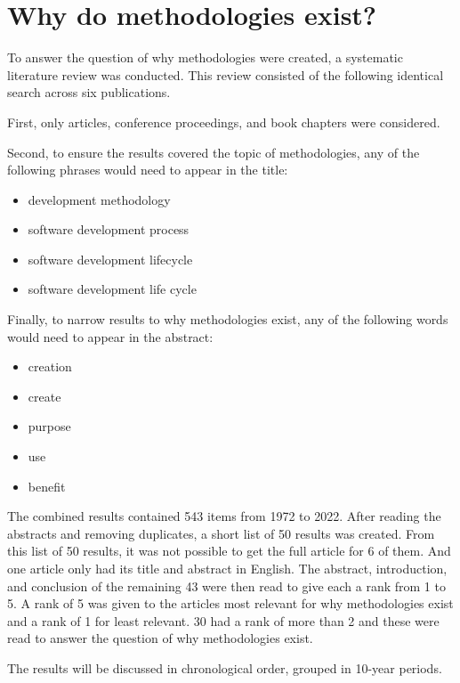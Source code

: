 \section{Why do methodologies exist?}
\label{sec:meth_why}
To answer the question of why methodologies were created, a systematic literature review  was conducted.
This review consisted of the following identical search across six publications.


First, only articles, conference proceedings, and book chapters were considered.

Second, to ensure the results covered the topic of methodologies, any of the following phrases would need to appear in the title:
\begin{itemize}
    \item development methodology
    \item software development process
    \item software development lifecycle
    \item software development life cycle
\end{itemize}

Finally, to narrow results to why methodologies exist, any of the following words would need to appear in the abstract:
\begin{itemize}
    \item creation
    \item create
    \item purpose
    \item use
    \item benefit
\end{itemize}

The combined results contained 543 items from 1972 to 2022.
After reading the abstracts and removing duplicates, a short list of 50 results was created.
From this list of 50 results, it was not possible to get the full article for 6 of them.
And one article only had its title and abstract in English.
The abstract, introduction, and conclusion of the remaining 43 were then read to give each a rank from 1 to 5.
A rank of 5 was given to the articles most relevant for why methodologies exist and a rank of 1 for least relevant.
30 had a rank of more than 2 and these were read to answer the question of why methodologies exist.

The results will be discussed in chronological order, grouped in 10-year periods. 

